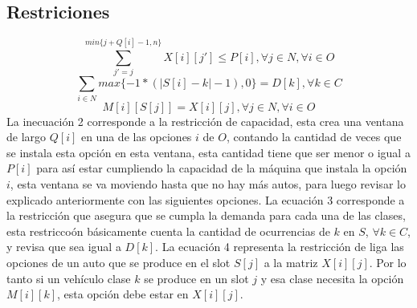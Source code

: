 \documentclass[letter, 10pt]{article}
\begin{document}
\subsection{Restriciones}
\begin{equation}
     \sum_{j'=j}^{min\{j+Q[i]-1,n\}} X[i][j'] \leq P[i],\forall j \in N,\forall i \in O
\end{equation}
\begin{equation}
     \sum_{i \in N} max\{-1*(|S[i] - k| - 1), 0\} = D[k],\forall k \in C
\end{equation}
\begin{equation}
    M[i][S[j]] = X[i][j], \forall j \in N, \forall i \in O
\end{equation}\newline
La inecuaci\'on 2 corresponde a la restricci\'on de capacidad, esta crea una ventana de largo $Q[i]$ en una de las opciones $i$ de $O   $, contando la cantidad de veces que se instala esta opci\'on en esta ventana, esta cantidad tiene que ser menor o igual a $P[i]$ para as\'i estar cumpliendo la capacidad de la m\'aquina que instala la opci\'on $i$, esta ventana se va moviendo hasta que no hay m\'as autos, para luego revisar lo explicado anteriormente con las siguientes opciones. La ecuaci\'on 3 corresponde a la restricci\'on que asegura que se cumpla la demanda para cada una de las clases, esta restricco\'on b\'asicamente cuenta la cantidad de ocurrencias de $k$ en $S$, $\forall k \in C$, y revisa que sea igual a $D[k]$. La ecuaci\'on 4 representa la restricci\'on de liga las opciones de un auto que se produce en el slot $S[j]$ a la matriz $X[i][j]$. Por lo tanto si un veh\'iculo clase $k$ se produce en un slot $j$ y esa clase necesita la opci\'on $M[i][k]$, esta opci\'on debe estar en $X[i][j]$.
\end{document}
